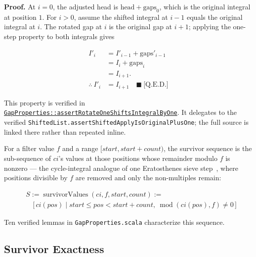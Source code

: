 \textbf{Proof.} At $i=0$, the adjusted head is
$\text{head}+\text{gaps}_0$, which is the original integral at position
$1$. For $i>0$, assume the shifted integral at $i-1$ equals the original
integral at $i$. The rotated gap at $i$ is the original gap at $i+1$;
applying the one-step property to both integrals gives

\begin{equation*}
\begin{aligned}
I'_i &= I'_{i-1} + \text{gaps}'_{i-1} \\
     &= I_i + \text{gaps}_i \\
     &= I_{i+1}. \\
\therefore\ I'_i &= I_{i+1}
\quad \blacksquare\ \text{[Q.E.D.]}
\end{aligned}
\end{equation*}

{\raggedright
This property is verified in
\href{https://github.com/thiagomata/prime-numbers/blob/integral-cycle-article-v1.0.0/src/main/scala/v1/chapter4/cycle/integral/recursive/properties/GapProperties.scala}{\texttt{GapProperties::\allowbreak assertRotateOneShiftsIntegralByOne}}.
It delegates to the verified
\texttt{ShiftedList.assertShiftedApplyIsOriginalPlusOne}; the full source is
linked there rather than repeated inline.
\par}

For a filter value $f$ and a range $[start, start + count)$, the survivor
sequence is the sub-sequence of $ci$'s values at those positions whose
remainder modulo $f$ is nonzero --- the cycle-integral analogue of one
Eratosthenes sieve step~\cite{hardywright1979}, where positions divisible by
$f$ are removed and only the non-multiples remain:

\begin{equation*}
\begin{aligned}
&S := \operatorname{survivorValues}(ci, f, start, count) := \\
&\quad \big[\, ci(pos) \mid start \le pos < start + count,\ \operatorname{mod}(ci(pos), f) \neq 0 \,\big]
\end{aligned}
\end{equation*}

Ten verified lemmas in \texttt{GapProperties.scala} characterize this
sequence.

\subsection{Survivor Exactness}

